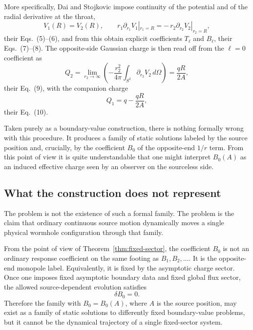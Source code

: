 \documentclass[aps,prd,onecolumn,nofootinbib,superscriptaddress]{revtex4-2}
\begin{document}
More specifically, Dai and Stojkovic impose continuity of the potential and of the radial derivative at the throat,
\begin{equation}
V_1(R)=V_2(R),
\qquad
r_1 \partial_{r_1}V_1|_{r_1=R}=-\,r_2\partial_{r_2}V_2|_{r_2=R},
\end{equation}
their Eqs.~(5)--(6), and from this obtain explicit coefficients $T_\ell$ and $B_\ell$, their Eqs.~(7)--(8).\cite{DaiStojkovic2019Observing} The opposite-side Gaussian charge is then read off from the $\ell=0$ coefficient as
\begin{equation}
Q_2=\lim_{r_2\to\infty}\left(-\frac{r_2^2}{4\pi}\int_{S^2}\partial_{r_2}V_2\, d\Omega\right)= \frac{qR}{2A},
\end{equation}
their Eq.~(9), with the companion charge
\begin{equation}
Q_1 = q-\frac{qR}{2A},
\end{equation}
their Eq.~(10).\cite{DaiStojkovic2019Observing}

Taken purely as a boundary-value construction, there is nothing formally wrong with this procedure. It produces a family of static solutions labeled by the source position and, crucially, by the coefficient $B_0$ of the opposite-end $1/r$ term. From this point of view it is quite understandable that one might interpret $B_0(A)$ as an induced effective charge seen by an observer on the sourceless side.

\subsection{What the construction does not represent}

The problem is not the existence of such a formal family. The problem is the claim that ordinary continuous source motion dynamically moves a single physical wormhole configuration through that family.

From the point of view of Theorem~\ref{thm:fixed-sector}, the coefficient $B_0$ is not an ordinary response coefficient on the same footing as $B_1,B_2,\dots$. It is the opposite-end monopole label. Equivalently, it is fixed by the asymptotic charge sector. Once one imposes fixed asymptotic boundary data and fixed global flux sector, the allowed source-dependent evolution satisfies
\begin{equation}
\delta B_0 = 0.
\end{equation}
Therefore the family with $B_0=B_0(A)$, where $A$ is the source position, may exist as a family of static solutions to differently fixed boundary-value problems, but it cannot be the dynamical trajectory of a single fixed-sector system.
\end{document}
